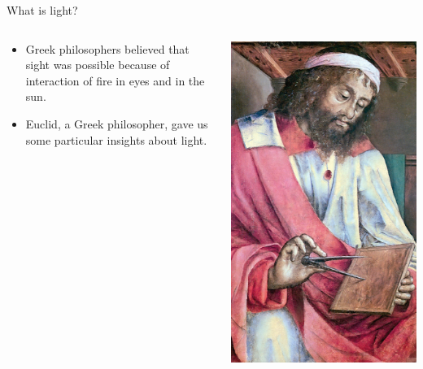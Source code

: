 % 

\begin{frame}{What is light?}
  \begin{columns}
    \begin{column}{0.7\textwidth}
      \begin{itemize}
        \item Greek philosophers believed that sight was possible because of interaction of fire in eyes and in the sun.
        \item Euclid, a Greek philosopher, gave  us some particular insights about light.
      \end{itemize}
    \end{column}
    \begin{column}{0.3\textwidth}
      \includegraphics[width=\columnwidth]{media/Euklid.jpg}
    \end{column}
  \end{columns}
\end{frame}

